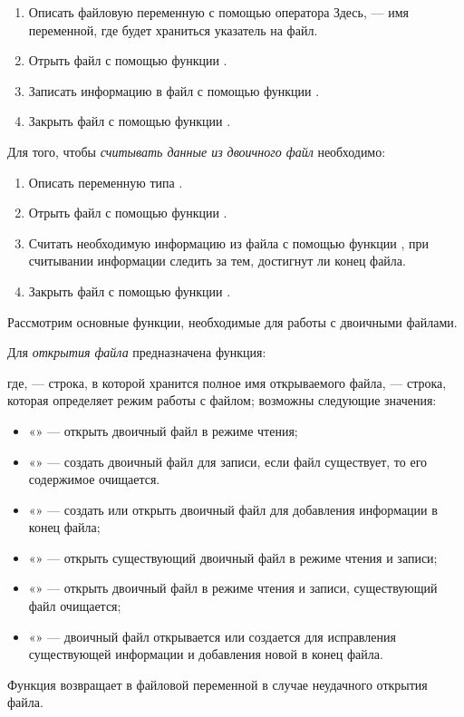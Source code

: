 \begin{enumerate}
\item Описать файловую переменную с помощью оператора
Здесь,  --- имя переменной, где будет храниться указатель на файл.
\item Отрыть файл с помощью функции .
\item Записать информацию в файл с помощью функции .
\item Закрыть файл с помощью функции .
\end{enumerate}
Для того, чтобы \emph{считывать данные из двоичного файл} необходимо:

\begin{enumerate}
\item Описать переменную типа .
\item Отрыть файл с помощью функции .
\item Считать необходимую информацию из файла с помощью функции , при считывании информации
следить за тем, достигнут ли конец файла.
\item Закрыть файл с помощью функции .
\end{enumerate}
Рассмотрим основные функции, необходимые для работы с двоичными файлами.

Для \emph{открытия файла} предназначена функция:

где,  --- строка, в которой хранится полное имя открываемого файла,  ---
строка, которая определяет режим работы с файлом; возможны следующие значения:
\begin{itemize}
\item[] «» --- открыть двоичный файл в режиме чтения;
\item[] «» --- создать двоичный файл для записи, если файл существует, то его содержимое очищается.
\item[] «» --- создать или открыть двоичный файл для добавления информации в конец файла;
\item[] «» --- открыть существующий двоичный файл в режиме чтения и записи;
\item[] «» --- открыть двоичный файл в режиме чтения и записи, существующий файл очищается;
\item[] «» --- двоичный файл открывается или создается для исправления существующей информации и
добавления новой в конец файла.
\end{itemize}
Функция  возвращает в файловой переменной  в случае неудачного открытия файла.


